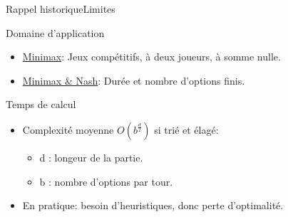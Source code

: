 
\begin{frame}{Rappel historique}{Limites}

\begin{block}{Domaine d'application}
\begin{itemize}
\item \underline{Minimax}: Jeux compétitifs, à deux joueurs, à somme nulle.
\item \underline{Minimax \& Nash}: Durée et nombre d'options finis.
\end{itemize}
\end{block}

\pause

\begin{block}{Temps de calcul}
\begin{itemize}
\item Complexité moyenne \emph{$O(b^{\frac{d}{2}})$} si trié et élagé:
	\begin{itemize}
	\item d : longeur de la partie.
	\item b : nombre d'options par tour.
	\end{itemize}
\item En pratique: besoin d'heuristiques, donc perte d'optimalité.
\end{itemize}
\end{block}

\end{frame}